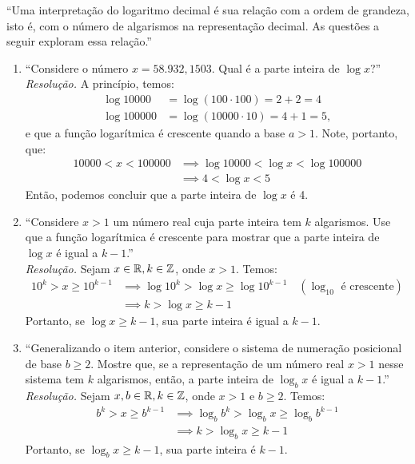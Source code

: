 \enquote{Uma interpretação do logaritmo decimal é sua relação com a ordem de grandeza, isto é, com o número de algarismos na representação decimal. As questões a seguir exploram essa relação.}
\begin{enumerate}
    \item \enquote{Considere o número $x = 58.932,1503$. Qual é a parte inteira de $\log x$?} \\
    \emph{Resolução.} A princípio, temos:
    \begin{align*}
        \log 10000 & = \log (100 \cdot 100) = 2 + 2 = 4 \\
        \log 100000 & = \log (10000 \cdot 10) = 4 + 1 = 5, 
    \end{align*}
    e que a função logarítmica é crescente quando a base $a > 1$. Note, portanto, que:
    \begin{align*}
        10000 < x < 100000 & \implies \log 10000 < \log x < \log 100000 \\ & \implies
        4 < \log x < 5
    \end{align*}
    Então, podemos concluir que a parte inteira de $\log x$ é 4.
    \item \enquote{Considere $x > 1$ um número real cuja parte inteira tem $k$ algarismos. Use que a função logarítmica é crescente para mostrar que a parte inteira de $\log x$ é igual a $k - 1$.}\\ 
    \emph{Resolução.} Sejam $x \in \mathbb R, k \in \mathbb Z$, onde $x > 1$. Temos:
    \begin{align*}
        10^k > x \ge 10^{k-1} & \implies \log 10^k > \log x \ge \log 10^{k-1} \quad (\text{$\log_10$ é crescente}) \\ & \implies
        k > \log x \ge k -1
    \end{align*}
    Portanto, se $\log x \ge k - 1$, sua parte inteira é igual a $k - 1$.
    \item \enquote{Generalizando o item anterior, considere o sistema de numeração posicional de base $b \ge 2$. Mostre que, se a representação de um número real $x > 1$ nesse sistema tem $k$ algarismos, então, a parte inteira de $\log_b x$ é igual a $k - 1$.}
    \emph{Resolução.} Sejam $x, b \in \mathbb R, k \in \mathbb Z$, onde $x > 1$ e $b \ge 2$. Temos:
    \begin{align*}
        b^k > x \ge b^{k-1} & \implies \log_b b^k > \log_b x \ge \log_b b^{k-1} \\ & \implies k > \log_b x \ge k - 1
    \end{align*}
    Portanto, se $\log_b x \ge k - 1$, sua parte inteira é $k - 1$.
\end{enumerate}